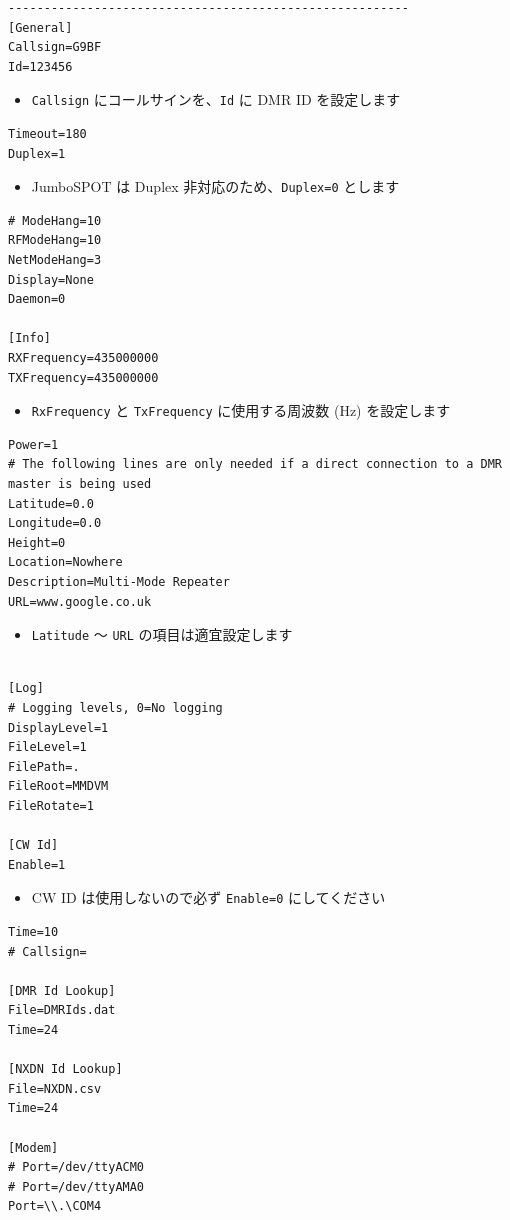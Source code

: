 \documentclass[a4j,oneside]{ujbook}
\begin{document}
\begin{verbatim}
--------------------------------------------------------
[General]
Callsign=G9BF
Id=123456
\end{verbatim}
\begin{itemize}
 \renewcommand{\labelitemi}{$\triangleright$}
 \item \verb+Callsign+ にコールサインを、\verb+Id+ に DMR ID を設定します
\end{itemize}
\begin{verbatim}
Timeout=180
Duplex=1
\end{verbatim}
\begin{itemize}
 \renewcommand{\labelitemi}{$\triangleright$}
 \item JumboSPOT は Duplex 非対応のため、\verb+Duplex=0+ とします
\end{itemize}
\begin{verbatim}
# ModeHang=10
RFModeHang=10
NetModeHang=3
Display=None
Daemon=0

[Info]
RXFrequency=435000000
TXFrequency=435000000
\end{verbatim}
\begin{itemize}
 \renewcommand{\labelitemi}{$\triangleright$}
 \item \verb+RxFrequency+ と \verb+TxFrequency+ に使用する周波数 (Hz) を設定します
\end{itemize}
\begin{verbatim}
Power=1
# The following lines are only needed if a direct connection to a DMR master is being used
Latitude=0.0
Longitude=0.0
Height=0
Location=Nowhere
Description=Multi-Mode Repeater
URL=www.google.co.uk
\end{verbatim}
\begin{itemize}
 \renewcommand{\labelitemi}{$\triangleright$}
 \item \verb+Latitude+ 〜 \verb+URL+ の項目は適宜設定します
\end{itemize}
\begin{verbatim}

[Log]
# Logging levels, 0=No logging
DisplayLevel=1
FileLevel=1
FilePath=.
FileRoot=MMDVM
FileRotate=1

[CW Id]
Enable=1
\end{verbatim}
\begin{itemize}
 \renewcommand{\labelitemi}{$\triangleright$}
 \item CW ID は使用しないので必ず \verb+Enable=0+ にしてください
\end{itemize}
\begin{verbatim}
Time=10
# Callsign=

[DMR Id Lookup]
File=DMRIds.dat
Time=24

[NXDN Id Lookup]
File=NXDN.csv
Time=24

[Modem]
# Port=/dev/ttyACM0
# Port=/dev/ttyAMA0
Port=\\.\COM4
\end{verbatim}
\end{document}
